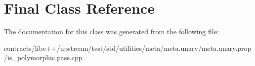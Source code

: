\hypertarget{class_final}{}\section{Final Class Reference}
\label{class_final}


The documentation for this class was generated from the following file\+:\begin{DoxyCompactItemize}
\item 
contracts/libc++/upstream/test/std/utilities/meta/meta.\+unary/meta.\+unary.\+prop/is\+\_\+polymorphic.\+pass.\+cpp\end{DoxyCompactItemize}
